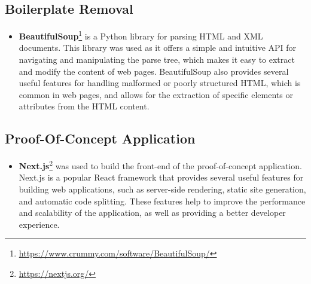\subsection{Boilerplate Removal}\label{subsec:boilerplate_removal}

\begin{itemize}
    \item \textbf{BeautifulSoup}\footnote{\url{https://www.crummy.com/software/BeautifulSoup/}} is a Python library for parsing HTML and XML documents.
    This library was used as it offers a simple and intuitive API for navigating and manipulating the parse tree, which makes it easy to extract and modify the content of web pages.
    BeautifulSoup also provides several useful features for handling malformed or poorly structured HTML, which is common in web pages, and allows for the extraction of specific elements or attributes from the HTML content.
\end{itemize}

\subsection{Proof-Of-Concept Application}\label{subsec:proof-of-concept-application}

\begin{itemize}
    \item \textbf{Next.js}\footnote{\url{https://nextjs.org/}} was used to build the front-end of the proof-of-concept application.
    Next.js is a popular React framework that provides several useful features for building web applications, such as server-side rendering, static site generation, and automatic code splitting.
    These features help to improve the performance and scalability of the application, as well as providing a better developer experience.
\end{itemize}


